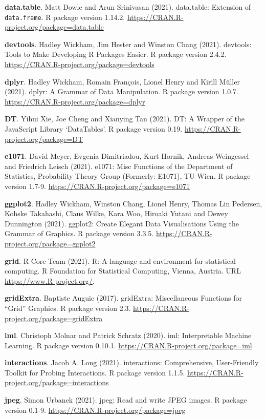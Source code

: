 \documentclass[
  12pt,
]{krantz}
\begin{document}
\textbf{data.table}. Matt Dowle and Arun Srinivasan (2021). data.table: Extension of \texttt{data.frame}. R package version 1.14.2. \url{https://CRAN.R-project.org/package=data.table}

\textbf{devtools}. Hadley Wickham, Jim Hester and Winston Chang (2021). devtools: Tools to Make Developing R Packages Easier. R package version 2.4.2. \url{https://CRAN.R-project.org/package=devtools}

\textbf{dplyr}. Hadley Wickham, Romain François, Lionel Henry and Kirill Müller (2021). dplyr: A Grammar of Data Manipulation. R package version 1.0.7. \url{https://CRAN.R-project.org/package=dplyr}

\textbf{DT}. Yihui Xie, Joe Cheng and Xianying Tan (2021). DT: A Wrapper of the JavaScript Library `DataTables'. R package version 0.19. \url{https://CRAN.R-project.org/package=DT}

\textbf{e1071}. David Meyer, Evgenia Dimitriadou, Kurt Hornik, Andreas Weingessel and Friedrich Leisch (2021). e1071: Misc Functions of the Department of Statistics, Probability
Theory Group (Formerly: E1071), TU Wien. R package version 1.7-9. \url{https://CRAN.R-project.org/package=e1071}

\textbf{ggplot2}. Hadley Wickham, Winston Chang, Lionel Henry, Thomas Lin Pedersen, Kohske Takahashi, Claus Wilke, Kara Woo, Hiroaki Yutani and Dewey Dunnington (2021). ggplot2: Create Elegant Data Visualisations Using the Grammar of Graphics. R package version 3.3.5. \url{https://CRAN.R-project.org/package=ggplot2}

\textbf{grid}. R Core Team (2021). R: A language and environment for statistical computing. R Foundation for Statistical Computing, Vienna, Austria. URL \url{https://www.R-project.org/}.

\textbf{gridExtra}. Baptiste Auguie (2017). gridExtra: Miscellaneous Functions for ``Grid'' Graphics. R package version 2.3. \url{https://CRAN.R-project.org/package=gridExtra}

\textbf{iml}. Christoph Molnar and Patrick Schratz (2020). iml: Interpretable Machine Learning. R package version 0.10.1. \url{https://CRAN.R-project.org/package=iml}

\textbf{interactions}. Jacob A. Long (2021). interactions: Comprehensive, User-Friendly Toolkit for Probing Interactions. R package version 1.1.5. \url{https://CRAN.R-project.org/package=interactions}

\textbf{jpeg}. Simon Urbanek (2021). jpeg: Read and write JPEG images. R package version 0.1-9. \url{https://CRAN.R-project.org/package=jpeg}
\end{document}
